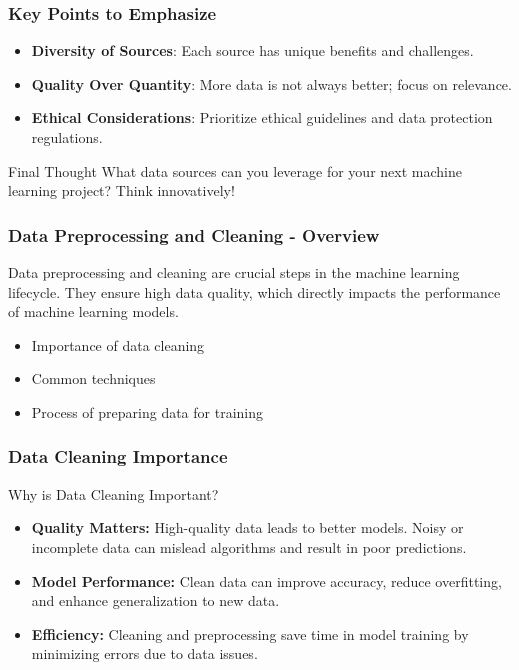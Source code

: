 \documentclass[aspectratio=169]{beamer}
\begin{document}
\begin{frame}[fragile]
    \frametitle{Key Points to Emphasize}
    \begin{itemize}
        \item \textbf{Diversity of Sources}: Each source has unique benefits and challenges.
        \item \textbf{Quality Over Quantity}: More data is not always better; focus on relevance.
        \item \textbf{Ethical Considerations}: Prioritize ethical guidelines and data protection regulations.
    \end{itemize}
    
    \begin{block}{Final Thought}
        What data sources can you leverage for your next machine learning project? Think innovatively!
    \end{block}
\end{frame}

\begin{frame}[fragile]
    \frametitle{Data Preprocessing and Cleaning - Overview}
    Data preprocessing and cleaning are crucial steps in the machine learning lifecycle. They ensure high data quality, which directly impacts the performance of machine learning models. 

    \begin{itemize}
        \item Importance of data cleaning
        \item Common techniques
        \item Process of preparing data for training
    \end{itemize}
\end{frame}

\begin{frame}[fragile]
    \frametitle{Data Cleaning Importance}
    \begin{block}{Why is Data Cleaning Important?}
        \begin{itemize}
            \item \textbf{Quality Matters:} High-quality data leads to better models. Noisy or incomplete data can mislead algorithms and result in poor predictions.
            \item \textbf{Model Performance:} Clean data can improve accuracy, reduce overfitting, and enhance generalization to new data.
            \item \textbf{Efficiency:} Cleaning and preprocessing save time in model training by minimizing errors due to data issues.
        \end{itemize}
    \end{block}
\end{frame}
\end{document}
